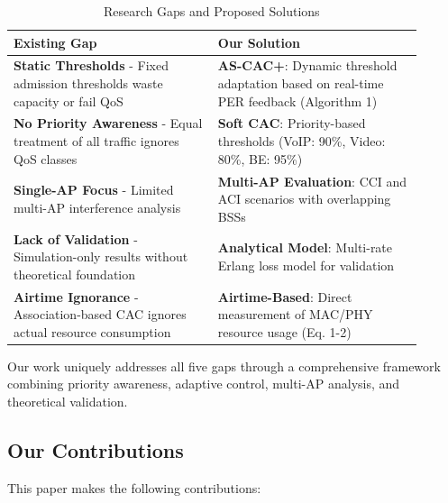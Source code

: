\documentclass[conference]{IEEEtran}
\begin{document}
\begin{table}[h]
\centering
\caption{Research Gaps and Proposed Solutions}
\label{tab:gaps}
\small
\begin{tabular}{p{0.45\linewidth}p{0.45\linewidth}}
\toprule
\textbf{Existing Gap} & \textbf{Our Solution} \\
\midrule
\textbf{Static Thresholds} - Fixed admission thresholds waste capacity or fail QoS \cite{10} & \textbf{AS-CAC+}: Dynamic threshold adaptation based on real-time PER feedback (Algorithm 1) \\
\midrule
\textbf{No Priority Awareness} - Equal treatment of all traffic ignores QoS classes \cite{13} & \textbf{Soft CAC}: Priority-based thresholds (VoIP: 90\%, Video: 80\%, BE: 95\%) \\
\midrule
\textbf{Single-AP Focus} - Limited multi-AP interference analysis \cite{4, 9} & \textbf{Multi-AP Evaluation}: CCI and ACI scenarios with overlapping BSSs \\
\midrule
\textbf{Lack of Validation} - Simulation-only results without theoretical foundation & \textbf{Analytical Model}: Multi-rate Erlang loss model for validation \\
\midrule
\textbf{Airtime Ignorance} - Association-based CAC ignores actual resource consumption \cite{3} & \textbf{Airtime-Based}: Direct measurement of MAC/PHY resource usage (Eq. 1-2) \\
\bottomrule
\end{tabular}
\end{table}

Our work uniquely addresses all five gaps through a comprehensive framework combining priority awareness, adaptive control, multi-AP analysis, and theoretical validation.

\subsection{Our Contributions}

This paper makes the following contributions:
\end{document}
